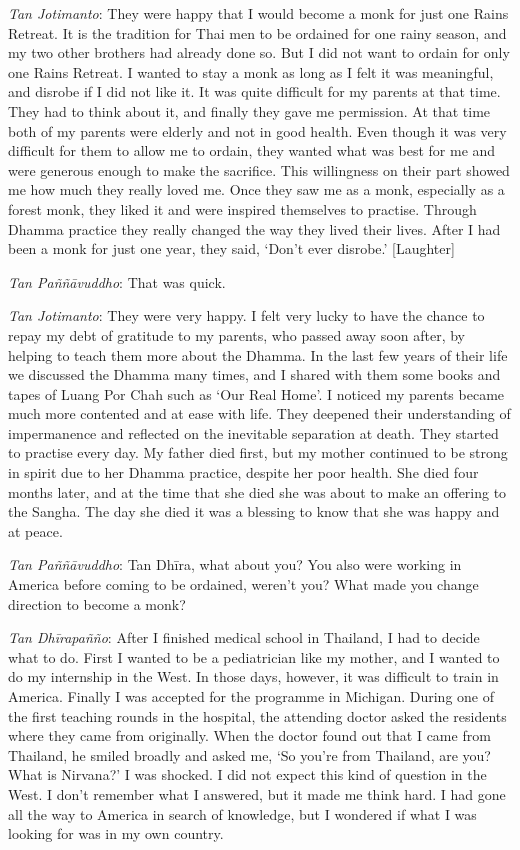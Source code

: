 \emph{Tan Jotimanto}: They were happy that I would become a monk for
just one Rains Retreat. It is the tradition for Thai men to be ordained
for one rainy season, and my two other brothers had already done so. But
I did not want to ordain for only one Rains Retreat. I wanted to stay a
monk as long as I felt it was meaningful, and disrobe if I did not like
it. It was quite difficult for my parents at that time. They had to
think about it, and finally they gave me permission. At that time both
of my parents were elderly and not in good health. Even though it was
very difficult for them to allow me to ordain, they wanted what was best
for me and were generous enough to make the sacrifice. This willingness
on their part showed me how much they really loved me. Once they saw me
as a monk, especially as a forest monk, they liked it and were inspired
themselves to practise. Through Dhamma practice they really changed the
way they lived their lives. After I had been a monk for just one year, 
they said, `Don't ever disrobe.' [Laughter]

\emph{Tan Paññāvuddho}: That was quick.

\emph{Tan Jotimanto}: They were very happy. I felt very lucky to have
the chance to repay my debt of gratitude to my parents, who passed away
soon after, by helping to teach them more about the Dhamma. In the last
few years of their life we discussed the Dhamma many times, and I shared
with them some books and tapes of Luang Por Chah such as `Our Real
Home'. I noticed my parents became much more contented and at ease with
life. They deepened their understanding of impermanence and reflected on
the inevitable separation at death. They started to practise every day. 
My father died first, but my mother continued to be strong in spirit due
to her Dhamma practice, despite her poor health. She died four months
later, and at the time that she died she was about to make an offering
to the Sangha. The day she died it was a blessing to know that she was
happy and at peace. 

\emph{Tan Paññāvuddho}: Tan Dhīra, what about you? You also were
working in America before coming to be ordained, weren't you? What made
you change direction to become a monk? 

\emph{Tan Dhīrapañño}: After I finished medical school in Thailand, I
had to decide what to do. First I wanted to be a pediatrician like my
mother, and I wanted to do my internship in the West. In those days, 
however, it was difficult to train in America. Finally I was accepted
for the programme in Michigan. During one of the first teaching rounds
in the hospital, the attending doctor asked the residents where they
came from originally. When the doctor found out that I came from
Thailand, he smiled broadly and asked me, `So you're from Thailand, are
you? What is Nirvana?' I was shocked. I did not expect this kind of
question in the West. I don't remember what I answered, but it made me
think hard. I had gone all the way to America in search of knowledge, 
but I wondered if what I was looking for was in my own country. 

